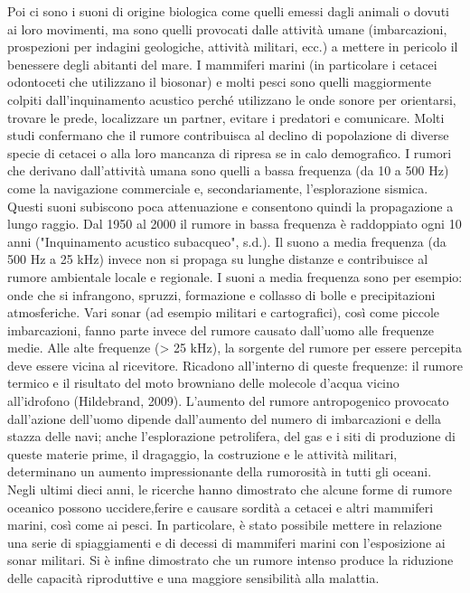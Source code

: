 Poi ci sono i suoni di origine biologica come quelli emessi dagli animali o dovuti ai loro movimenti, ma sono quelli provocati dalle attività umane (imbarcazioni, prospezioni per indagini geologiche, attività militari, ecc.) a mettere in pericolo il benessere degli abitanti del mare. 
I mammiferi marini (in particolare i cetacei odontoceti che utilizzano il biosonar) e molti pesci sono quelli maggiormente colpiti dall’inquinamento acustico perché utilizzano le onde sonore per orientarsi, trovare le prede, localizzare un partner, evitare i predatori e comunicare. 
Molti studi confermano che il rumore contribuisca al declino di popolazione di diverse specie di cetacei o alla loro mancanza di ripresa se in calo demografico. 
I rumori che derivano dall’attività umana sono quelli a bassa frequenza (da 10 a 500 Hz) come la navigazione commerciale e, secondariamente, l’esplorazione sismica. 
Questi suoni subiscono poca attenuazione e consentono quindi la propagazione a lungo raggio. 
Dal 1950 al 2000 il rumore in bassa frequenza è raddoppiato ogni 10 anni ("Inquinamento acustico subacqueo", s.d.). 
Il suono a media frequenza (da 500 Hz a 25 kHz) invece non si propaga su lunghe distanze e contribuisce al rumore ambientale locale e regionale. 
I suoni a media frequenza sono per esempio: onde che si infrangono, spruzzi, formazione e collasso di bolle e precipitazioni atmosferiche. Vari sonar (ad esempio militari e cartografici), così come piccole imbarcazioni, fanno parte invece del rumore causato dall’uomo alle frequenze medie. 
Alle alte frequenze (> 25 kHz), la sorgente del rumore per essere percepita deve essere vicina al ricevitore. 
Ricadono all’interno di queste frequenze: il rumore termico e il risultato del moto browniano delle molecole d'acqua vicino all'idrofono (Hildebrand, 2009).
L’aumento del rumore antropogenico provocato dall’azione dell’uomo dipende dall’aumento del numero di imbarcazioni e della stazza delle navi; anche l'esplorazione petrolifera, del gas e i siti di produzione di queste materie prime, il dragaggio, la costruzione e le attività militari, determinano un aumento impressionante della rumorosità in tutti gli oceani. Negli ultimi dieci anni, le ricerche hanno dimostrato che alcune forme di rumore oceanico possono uccidere,ferire e causare sordità a cetacei e altri mammiferi marini, così come ai pesci. 
In particolare, è stato possibile mettere in relazione una serie di spiaggiamenti e di decessi di mammiferi marini con l'esposizione ai sonar militari. 
Si è infine dimostrato che un rumore intenso produce la riduzione delle capacità riproduttive e una maggiore sensibilità alla malattia.



